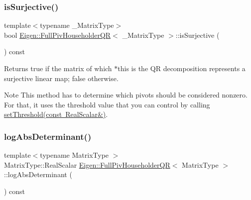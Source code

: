 \subsubsection{\texorpdfstring{isSurjective()}{isSurjective()}}
{\footnotesize\ttfamily template$<$typename \+\_\+\+Matrix\+Type$>$ \\
bool \mbox{\hyperlink{class_eigen_1_1_full_piv_householder_q_r}{Eigen\+::\+Full\+Piv\+Householder\+QR}}$<$ \+\_\+\+Matrix\+Type $>$\+::is\+Surjective (\begin{DoxyParamCaption}{ }\end{DoxyParamCaption}) const\hspace{0.3cm}{\ttfamily [inline]}}

\begin{DoxyReturn}{Returns}
true if the matrix of which $\ast$this is the QR decomposition represents a surjective linear map; false otherwise.
\end{DoxyReturn}
\begin{DoxyNote}{Note}
This method has to determine which pivots should be considered nonzero. For that, it uses the threshold value that you can control by calling \mbox{\hyperlink{class_eigen_1_1_full_piv_householder_q_r_a92277e572bf98245891015d12dd2b602}{set\+Threshold(const Real\+Scalar\&)}}. 
\end{DoxyNote}
\mbox{\label{class_eigen_1_1_full_piv_householder_q_r_aafde38918912c9b562f44b0fc3b22589}} 
\subsubsection{\texorpdfstring{logAbsDeterminant()}{logAbsDeterminant()}}
{\footnotesize\ttfamily template$<$typename Matrix\+Type $>$ \\
Matrix\+Type\+::\+Real\+Scalar \mbox{\hyperlink{class_eigen_1_1_full_piv_householder_q_r}{Eigen\+::\+Full\+Piv\+Householder\+QR}}$<$ Matrix\+Type $>$\+::log\+Abs\+Determinant (\begin{DoxyParamCaption}{ }\end{DoxyParamCaption}) const}

